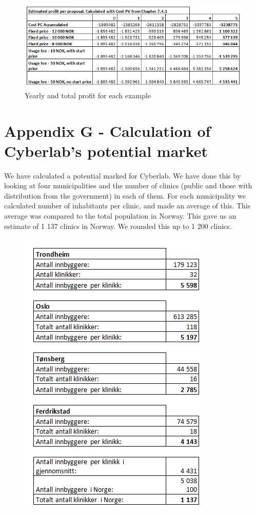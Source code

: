 \begin{figure}
\begin{center}
\includegraphics[scale=0.8]{revenuepvappendixprofit}
\caption{Yearly and total profit for each example}
\label{fig:profitAll}
\end{center}
\end{figure}

\newpage
\section*{Appendix G - Calculation of Cyberlab's potential market}
\label{G}

We have calculated a potential marked for Cyberlab. We have done this by looking at four municipalities and the number of clinics (public and those with distribution from the government) in each of them. For each municipality we calculated number of inhabitants per clinic, and made an average of this. This average was compared to the total population in Norway. This gave us an estimate of 1 137 clinics in Norway. We rounded this up to 1 200 clinics.

\begin{figure}
\begin{center}
\includegraphics[scale=0.8]{antallklinikker}
\label{fig:clinics}
\end{center}
\end{figure}

